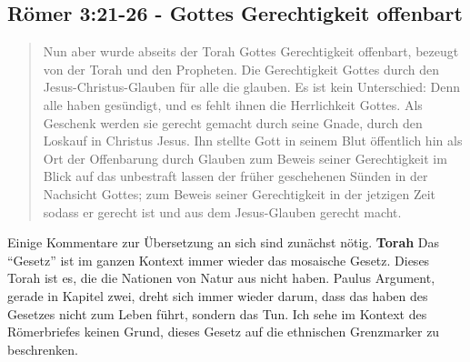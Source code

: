 \subsection{Römer 3:21-26 - Gottes Gerechtigkeit offenbart}
\begin{quote}
	Nun aber wurde abseits der Torah Gottes Gerechtigkeit offenbart, bezeugt von der Torah und den Propheten.
	Die Gerechtigkeit Gottes durch den Jesus-Christus-Glauben für alle die glauben.
	Es ist kein Unterschied: Denn alle haben gesündigt, und es fehlt ihnen die Herrlichkeit Gottes.
	Als Geschenk werden sie gerecht gemacht durch seine Gnade, durch den Loskauf in Christus Jesus.
	Ihn stellte Gott in seinem Blut öffentlich hin als Ort der Offenbarung durch Glauben
	zum Beweis seiner Gerechtigkeit im Blick auf das unbestraft lassen der früher geschehenen Sünden
	in der Nachsicht Gottes;
	zum Beweis seiner Gerechtigkeit in der jetzigen Zeit
	sodass er gerecht ist und aus dem Jesus-Glauben gerecht macht.
\end{quote}

Einige Kommentare zur Übersetzung an sich sind zunächst nötig.
\textbf{Torah} Das ``Gesetz'' ist im ganzen Kontext immer wieder das mosaische Gesetz. Dieses Torah ist es, die die Nationen von Natur aus nicht haben.
		Paulus Argument, gerade in Kapitel zwei, dreht sich immer wieder darum, dass das haben des Gesetzes nicht zum Leben führt, sondern das Tun.
		Ich sehe im Kontext des Römerbriefes keinen Grund, dieses Gesetz auf die ethnischen Grenzmarker zu beschrenken.

